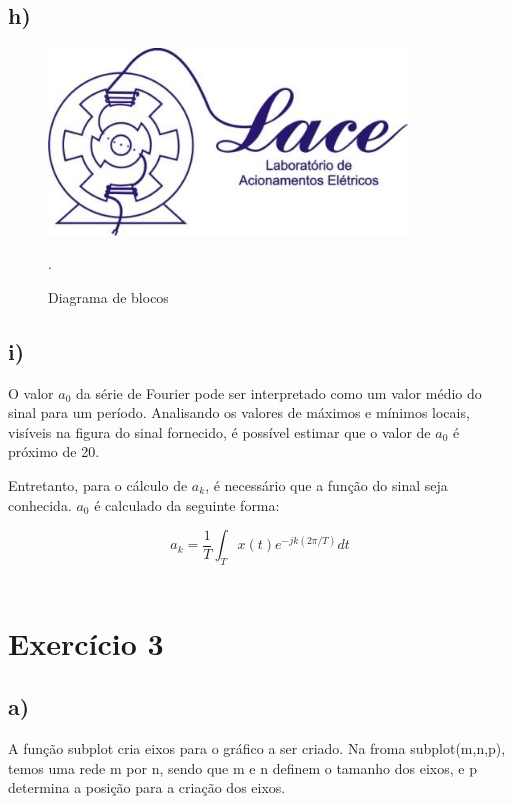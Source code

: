 \documentclass{article}[a4paper,12pt,twoside]
\begin{document}
\subsection{h)}

\begin{figure}[H]
    \centering
    \includegraphics[width=0.85\textwidth]{a}
    \caption{Diagrama de blocos}.
    \label{fig:my_label}
\end{figure}

\subsection{i)}


O valor $a_0$ da série de Fourier pode ser interpretado como um valor médio do sinal para um período. Analisando os valores de máximos e mínimos locais, visíveis na figura do sinal fornecido, é possível estimar que o valor de $a_0$ é próximo de 20.

Entretanto, para o cálculo de $a_k$, é necessário que a função do sinal seja conhecida. $a_0$ é calculado da seguinte forma:

\begin{center}
    $$a_k = \frac{1}{T}\int_{T}^{} x(t)e^{-jk(2\pi/T)} dt$$\\
\end{center}


\section{Exercício 3}

\subsection{a)}

A função subplot cria eixos para o gráfico a ser criado. Na froma subplot(m,n,p), temos uma rede m por n, sendo que m e n definem o tamanho dos eixos, e p determina a posição para a criação dos eixos.  
\end{document}
